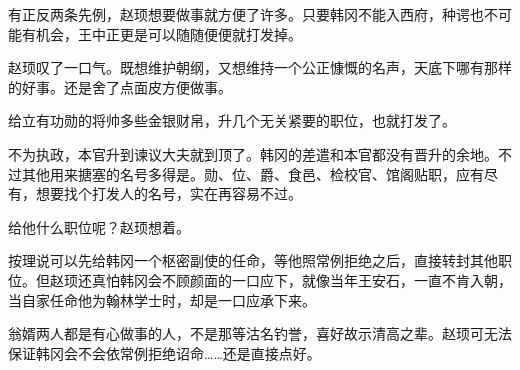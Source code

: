 有正反两条先例，赵顼想要做事就方便了许多。只要韩冈不能入西府，种谔也不可能有机会，王中正更是可以随随便便就打发掉。

赵顼叹了一口气。既想维护朝纲，又想维持一个公正慷慨的名声，天底下哪有那样的好事。还是舍了点面皮方便做事。

给立有功勋的将帅多些金银财帛，升几个无关紧要的职位，也就打发了。

不为执政，本官升到谏议大夫就到顶了。韩冈的差遣和本官都没有晋升的余地。不过其他用来搪塞的名号多得是。勋、位、爵、食邑、检校官、馆阁贴职，应有尽有，想要找个打发人的名号，实在再容易不过。

给他什么职位呢？赵顼想着。

按理说可以先给韩冈一个枢密副使的任命，等他照常例拒绝之后，直接转封其他职位。但赵顼还真怕韩冈会不顾颜面的一口应下，就像当年王安石，一直不肯入朝，当自家任命他为翰林学士时，却是一口应承下来。

翁婿两人都是有心做事的人，不是那等沽名钓誉，喜好故示清高之辈。赵顼可无法保证韩冈会不会依常例拒绝诏命……还是直接点好。

